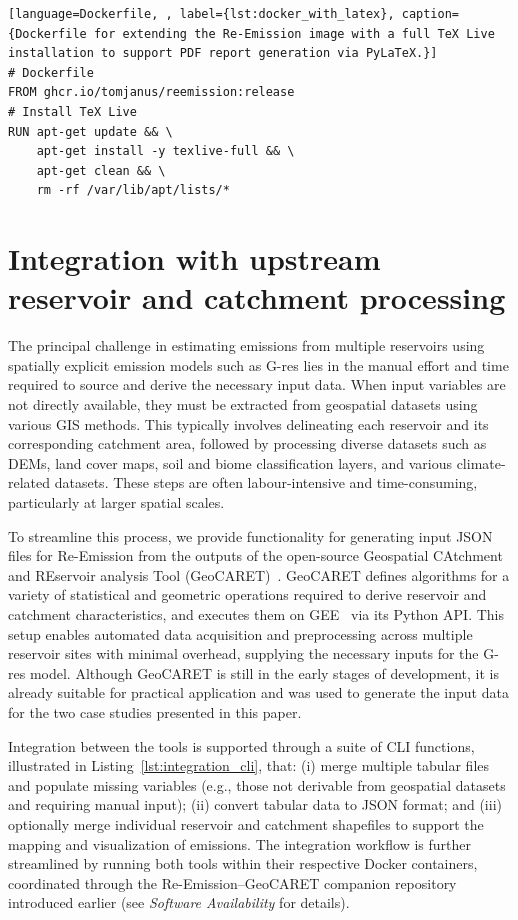 \documentclass[final,1p,times]{elsarticle}
\begin{document}
\begin{minipage}{0.95\textwidth}
\begin{lstlisting}[language=Dockerfile, , label={lst:docker_with_latex}, caption={Dockerfile for extending the Re-Emission image with a full TeX Live installation to support PDF report generation via PyLaTeX.}]
# Dockerfile
FROM ghcr.io/tomjanus/reemission:release
# Install TeX Live
RUN apt-get update && \
    apt-get install -y texlive-full && \
    apt-get clean && \
    rm -rf /var/lib/apt/lists/*
\end{lstlisting}
\end{minipage}

\section{Integration with upstream reservoir and catchment processing}
\label{sec:integration}

The principal challenge in estimating emissions from multiple reservoirs using spatially explicit emission models such as G-res lies in the manual effort and time required to source and derive the necessary input data.
When input variables are not directly available, they must be extracted from geospatial datasets using various \ac{GIS} methods.
This typically involves delineating each reservoir and its corresponding catchment area, followed by processing diverse datasets such as \acp{DEM}, land cover maps, soil and biome classification layers, and various climate-related datasets.
These steps are often labour-intensive and time-consuming, particularly at larger spatial scales.

To streamline this process, we provide functionality for generating input JSON files for Re-Emission from the outputs of the open-source Geospatial CAtchment and REservoir analysis Tool (GeoCARET)~\cite{heettool}.
GeoCARET defines algorithms for a variety of statistical and geometric operations required to derive reservoir and catchment characteristics, and executes them on \ac{GEE}~\cite{gorelick2017google} via its Python API.
This setup enables automated data acquisition and preprocessing across multiple reservoir sites with minimal overhead, supplying the necessary inputs for the G-res model.
Although GeoCARET is still in the early stages of development, it is already suitable for practical application and was used to generate the input data for the two case studies presented in this paper.

Integration between the tools is supported through a suite of \ac{CLI} functions, illustrated in Listing~\ref{lst:integration_cli}, that:
(i) merge multiple tabular files and populate missing variables (e.g., those not derivable from geospatial datasets and requiring manual input);
(ii) convert tabular data to JSON format; and
(iii) optionally merge individual reservoir and catchment shapefiles to support the mapping and visualization of emissions.
The integration workflow is further streamlined by running both tools within their respective Docker containers, coordinated through the Re-Emission--GeoCARET companion repository~\cite{janus_geocaret_reemission} introduced earlier (see \emph{Software Availability} for details).
\end{document}
